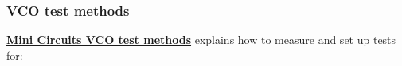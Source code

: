 




\subsubsection*{VCO test methods}

\href{https://edisciplinas.usp.br/pluginfile.php/8192379/mod_resource/content/0/VCO-Test_Methods_VCO15-15.pdf}{\textbf{Mini Circuits VCO test methods}} explains how to measure and set up tests for:

